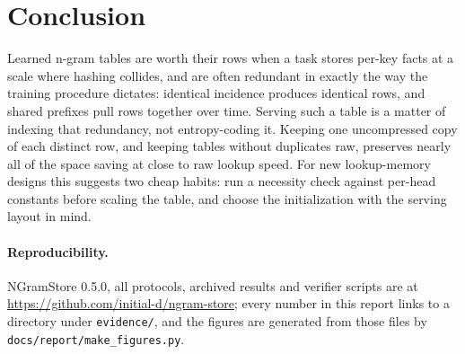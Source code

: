 \documentclass[10pt]{article}
\begin{document}
\section{Conclusion}

Learned n-gram tables are worth their rows when a task stores per-key facts at a scale where hashing collides, and are often redundant in exactly the way the training procedure dictates: identical incidence produces identical rows, and shared prefixes pull rows together over time. Serving such a table is a matter of indexing that redundancy, not entropy-coding it. Keeping one uncompressed copy of each distinct row, and keeping tables without duplicates raw, preserves nearly all of the space saving at close to raw lookup speed. For new lookup-memory designs this suggests two cheap habits: run a necessity check against per-head constants before scaling the table, and choose the initialization with the serving layout in mind.

\paragraph{Reproducibility.} NGramStore 0.5.0, all protocols, archived results and verifier scripts are at \url{https://github.com/initial-d/ngram-store}; every number in this report links to a directory under \texttt{evidence/}, and the figures are generated from those files by \texttt{docs/report/make\_figures.py}.

\small


\end{document}
